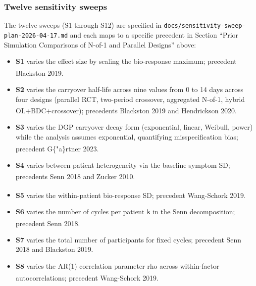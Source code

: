 \documentclass[
  11pt,
]{article}
\providecommand{\tightlist}{%
  \setlength{\itemsep}{0pt}\setlength{\parskip}{0pt}}
\begin{document}
\subsubsection{Twelve sensitivity
sweeps}\label{twelve-sensitivity-sweeps}

The twelve sweeps (S1 through S12) are specified in
\texttt{docs/sensitivity-sweep-plan-2026-04-17.md} and each maps to a
specific precedent in Section ``Prior Simulation Comparisons of N-of-1
and Parallel Designs'' above:

\begin{itemize}
\tightlist
\item
  \textbf{S1} varies the effect size by scaling the bio-response
  maximum; precedent Blackston
  2019\textsuperscript{}.
\item
  \textbf{S2} varies the carryover half-life across nine values from 0
  to 14 days across four designs (parallel RCT, two-period crossover,
  aggregated N-of-1, hybrid OL+BDC+crossover); precedents Blackston 2019
  and Hendrickson
  2020\textsuperscript{}.
\item
  \textbf{S3} varies the DGP carryover decay form (exponential, linear,
  Weibull, power) while the analysis assumes exponential, quantifying
  misspecification bias; precedent G\{"a\}rtner
  2023\textsuperscript{}.
\item
  \textbf{S4} varies between-patient heterogeneity via the
  baseline-symptom SD; precedents Senn
  2018\textsuperscript{}
  and Zucker
  2010\textsuperscript{}.
\item
  \textbf{S5} varies the within-patient bio-response SD; precedent
  Wang-Schork
  2019\textsuperscript{}.
\item
  \textbf{S6} varies the number of cycles per patient \texttt{k} in the
  Senn decomposition; precedent Senn
  2018\textsuperscript{}.
\item
  \textbf{S7} varies the total number of participants for fixed cycles;
  precedent Senn 2018 and Blackston 2019.
\item
  \textbf{S8} varies the AR(1) correlation parameter rho across
  within-factor autocorrelations; precedent Wang-Schork
  2019\textsuperscript{}.

\end{itemize}
\end{document}
